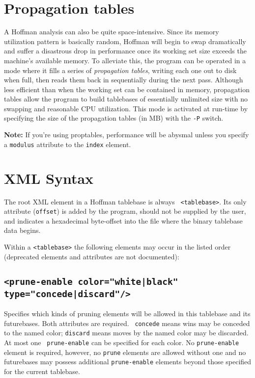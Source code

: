 \documentclass[11pt]{article}
\begin{document}
\section{Propagation tables}

A Hoffman analysis can also be quite space-intensive.  Since its
memory utilization pattern is basically random, Hoffman will begin to
swap dramatically and suffer a disastrous drop in performance once its
working set size exceeds the machine's available memory.  To alleviate
this, the program can be operated in a mode where it fills a series of
{\it propagation tables}, writing each one out to disk when full, then
reads them back in sequentially during the next pass.  Although less
efficient than when the working set can be contained in memory,
propagation tables allow the program to build tablebases of
essentially unlimited size with no swapping and reasonable CPU
utilization.  This mode is activated at run-time by specifying the
size of the propagation tables (in MB) with the {\tt -P} switch.

{\bf Note:} If you're using proptables, performance will be abysmal
unless you specify a {\tt modulus} attribute to the {\tt index}
element.


\vfil\eject
\section{XML Syntax}

The root XML element in a Hoffman tablebase is always {\tt
<tablebase>}.  Its only attribute ({\tt offset}) is added by the
program, should not be supplied by the user, and indicates a
hexadecimal byte-offset into the file where the binary tablebase data
begins.

Within a {\tt <tablebase>} the following elements may
occur in the listed order (deprecated elements and attributes are not
documented):

\subsection{\tt <prune-enable color="white|black" type="concede|discard"/>}

Specifies which kinds of pruning elements will be allowed in this
tablebase and its futurebases.  Both attributes are required.  {\tt
concede} means wins may be conceded to the named color; {\tt discard}
means moves by the named color may be discarded.  At most one {\tt
prune-enable} can be specified for each color.  No {\tt prune-enable}
element is required, however, no {\tt prune} elements are allowed without
one and no futurebases may possess additional {\tt prune-enable}
elements beyond those specified for the current tablebase.
\end{document}
